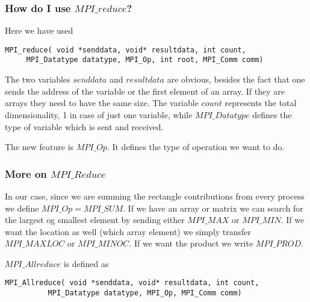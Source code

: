 \documentclass{beamer}
\begin{document}
\begin{frame}
\frametitle{How do I use $MPI\_reduce$?}

\begin{block}{}

Here we have used



\begin{verbatim}
MPI_reduce( void *senddata, void* resultdata, int count, 
     MPI_Datatype datatype, MPI_Op, int root, MPI_Comm comm)

\end{verbatim}


The two variables $senddata$ and $resultdata$ are obvious, besides the fact that one sends the address
of the variable or the first element of an array.  If they are arrays they need to have the same size. 
The variable $count$ represents the total dimensionality, 1 in case of just one variable, 
while $MPI\_Datatype$ 
defines the type of variable which is sent and received.  

The new feature is $MPI\_Op$. It defines the type
of operation we want to do. 
\end{block}
\end{frame}

\begin{frame}
\frametitle{More on $MPI\_Reduce$}

\begin{block}{}
In our case, since we are summing
the rectangle  contributions from every process we define  $MPI\_Op = MPI\_SUM$.
If we have an array or matrix we can search for the largest og smallest element by sending either $MPI\_MAX$ or 
$MPI\_MIN$.  If we want the location as well (which array element) we simply transfer 
$MPI\_MAXLOC$ or $MPI\_MINOC$. If we want the product we write $MPI\_PROD$. 

$MPI\_Allreduce$ is defined as



\begin{verbatim}
MPI_Allreduce( void *senddata, void* resultdata, int count, 
          MPI_Datatype datatype, MPI_Op, MPI_Comm comm)        

\end{verbatim}


\end{block}
\end{frame}
\end{document}
